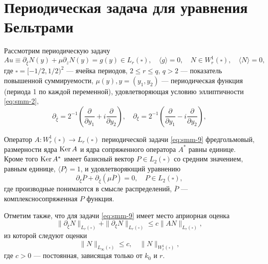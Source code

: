 \section{Периодическая задача для уравнения Бельтрами}
Рассмотрим периодическую задачу
\begin{equation}\label{eq:smm-9}
Au\equiv\partial_{\bar{\xi}}N(y)+\mu\partial_z N(y)=g(y)\in L_r(\square) ,\quad  \langle g\rangle=0, \quad N\in W_r^1(\square), \quad \langle N\rangle=0,
\end{equation} 
	где $\square=[-1/2, 1/2)^2$ --- ячейка периодов, $2\leqslant r\leqslant q$, $q>2$ --- показатель повышенной суммируемости, $\mu(y),y=(y_1,y_2 )$ --- периодическая функция (периода 1 по каждой переменной), удовлетворяющая условию эллиптичности \eqref{eq:smm-2},
$$
\partial_{\bar{\xi}}=2^{-1}\left(\frac{\partial}{\partial y_1}+i\frac{\partial}{\partial y_2}\right),\quad \partial_{\xi}=2^{-1}\left(\frac{\partial}{\partial y_1}-i\frac{\partial}{\partial y_2}\right),
$$
\begin{theorem}\label{th:smm-3}
	Оператор $A:W_r^1(\square)\to L_r(\square) $ периодической  задачи  \eqref{eq:smm-9}  фредгольмовый, размерности ядра  $\text{\rm Ker}\,A$  и ядра сопряженного оператора $A^\ast$ равны единице. Кроме того $\text{\rm Ker}\,A^\ast$ имеет базисный вектор $P\in L_2(\square)$ со средним значением, равным единице, $\langle P\rangle=1$, и удовлетворяющий уравнению
	$$
	\partial_\xi\overline{P}+\partial_{\bar\xi}(\mu\overline{P})=0,\quad P\in L_2(\square),                                
	$$
	где производные понимаются в смысле распределений, $\overline{P}$ --- комплексносопряженная $P$ \linebreak функция.
\end{theorem}

Отметим также, что для задачи \eqref{eq:smm-9} имеет место априорная оценка 
$$
\|\partial_{\bar\xi} N\|_{L_r(\square) }+\|\partial_{\xi} N\|_{L_r(\square) }  \leqslant
c\|AN\|_{L_r(\square)},
$$   
из которой следуют оценки
$$
\|N\|_{L_\infty(\square)}\leqslant c, \quad \|N\|_{W_r^1(\square)},
$$         
где $c>0$ --- постоянная, зависящая только от $k_0$ и $r$.


